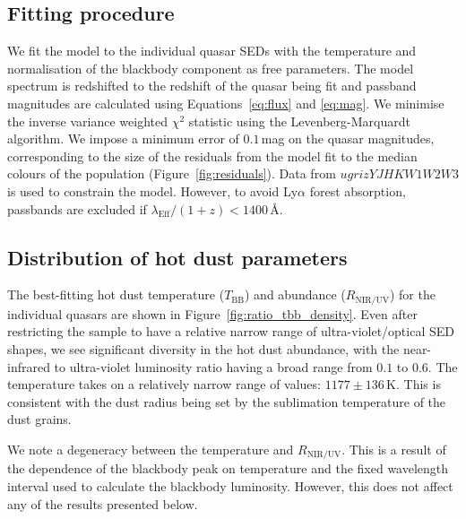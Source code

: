 \subsection{Fitting procedure}

We fit the model to the individual quasar SEDs with the temperature and normalisation of the blackbody component as free parameters.
The model spectrum is redshifted to the redshift of the quasar being fit and passband magnitudes are calculated using Equations~\ref{eq:flux} and \ref{eq:mag}.
We minimise the inverse variance weighted $\chi^2$ statistic using the Levenberg-Marquardt algorithm.
We impose a minimum error of $0.1$\,mag on the quasar magnitudes, corresponding to the size of the residuals from the model fit to the median colours of the population (Figure~\ref{fig:residuals}).
Data from $ugrizYJHKW1W2W3$ is used to constrain the model.
However, to avoid Ly$\alpha$ forest absorption, passbands are excluded if $\lambda_{\text{Eff}} / (1 + z) < 1400$\,\AA.

\subsection{Distribution of hot dust parameters}

The best-fitting hot dust temperature ($T_{\text{BB}}$) and abundance ($R_{\text{NIR/UV}}$) for the individual quasars are shown in Figure~\ref{fig:ratio_tbb_density}.
Even after restricting the sample to have a relative narrow range of ultra-violet/optical SED shapes, we see significant diversity in the hot dust abundance, with the near-infrared to ultra-violet luminosity ratio having a broad range from $0.1$ to $0.6$.
The temperature takes on a relatively narrow range of values: $1177\pm136$\,K.
This is consistent with the dust radius being set by the sublimation temperature of the dust grains.

We note a degeneracy between the temperature and $R_{\text{NIR/UV}}$.
This is a result of the dependence of the blackbody peak on temperature and the fixed wavelength interval used to calculate the blackbody luminosity.
However, this does not affect any of the results presented below.


